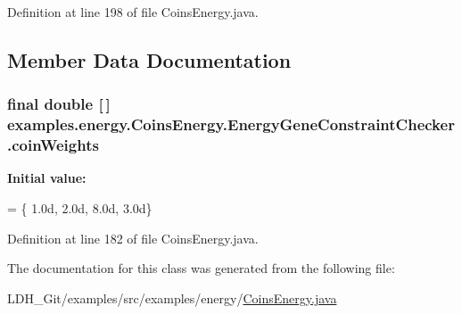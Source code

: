 Definition at line 198 of file Coins\-Energy.\-java.



\subsection{Member Data Documentation}
\hypertarget{classexamples_1_1energy_1_1_coins_energy_1_1_energy_gene_constraint_checker_ac711f1ef6fe142a4b2a62b8b0c77c409}{
\subsubsection[{coin\-Weights}]{\setlength{\rightskip}{0pt plus 5cm}final double \mbox{[}$\,$\mbox{]} examples.\-energy.\-Coins\-Energy.\-Energy\-Gene\-Constraint\-Checker.\-coin\-Weights\hspace{0.3cm}{\ttfamily [static]}}}\label{classexamples_1_1energy_1_1_coins_energy_1_1_energy_gene_constraint_checker_ac711f1ef6fe142a4b2a62b8b0c77c409}
{\bfseries Initial value\-:}
\begin{DoxyCode}
= \{
        1.0d, 2.0d, 8.0d, 3.0d\}
\end{DoxyCode}


Definition at line 182 of file Coins\-Energy.\-java.



The documentation for this class was generated from the following file\-:\begin{DoxyCompactItemize}
\item 
L\-D\-H\-\_\-\-Git/examples/src/examples/energy/\hyperlink{_coins_energy_8java}{Coins\-Energy.\-java}\end{DoxyCompactItemize}
